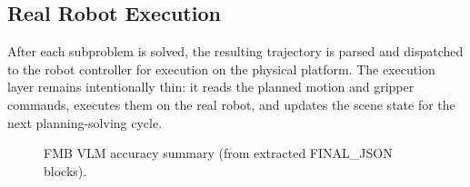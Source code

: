 \documentclass[journal]{IEEEtran}
\begin{document}
  \subsection{Real Robot Execution}
  \label{subsec:phase4}

  After each subproblem is solved, the resulting trajectory is parsed and
  dispatched to the robot controller for execution on the physical platform.
  The execution layer remains intentionally thin: it reads the planned motion
  and gripper commands, executes them on the real robot, and updates the scene
  state for the next planning-solving cycle.

  \begin{figure}[!t]
    \centering
    
    \caption{FMB VLM accuracy summary (from extracted FINAL\_JSON blocks).}
    \label{fig:fmb_accuracy}
  \end{figure}
\end{document}
